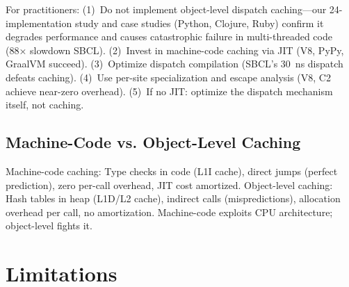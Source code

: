 \documentclass[sigplan,final,acmsmall,review,screen]{acmart}
\begin{document}
For practitioners: (1)~Do not implement object-level dispatch caching—our 24-implementation study and case studies (Python, Clojure, Ruby) confirm it degrades performance and causes catastrophic failure in multi-threaded code (88× slowdown SBCL). (2)~Invest in machine-code caching via JIT (V8, PyPy, GraalVM succeed). (3)~Optimize dispatch compilation (SBCL's 30~ns dispatch defeats caching). (4)~Use per-site specialization and escape analysis (V8, C2 achieve near-zero overhead). (5)~If no JIT: optimize the dispatch mechanism itself, not caching.

\subsection{Machine-Code vs. Object-Level Caching}

Machine-code caching: Type checks in code (L1I cache), direct jumps (perfect prediction), zero per-call overhead, JIT cost amortized. Object-level caching: Hash tables in heap (L1D/L2 cache), indirect calls (mispredictions), allocation overhead per call, no amortization. Machine-code exploits CPU architecture; object-level fights it.

\section{Limitations}
\end{document}
